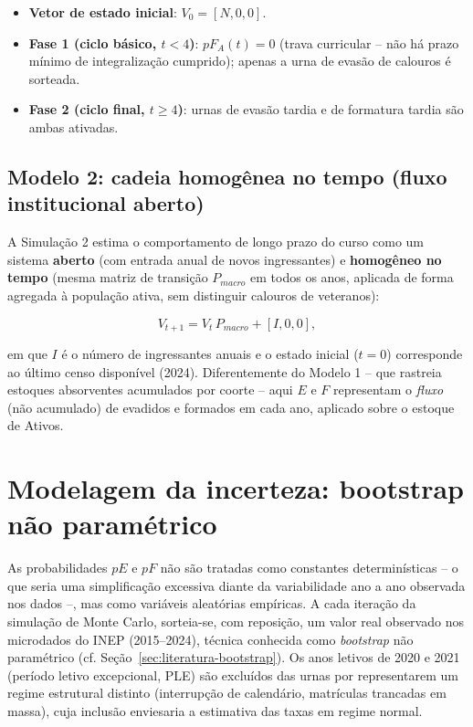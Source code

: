 \documentclass[12pt,times,article,chapter=TITLE]{abnt}
\begin{document}
\begin{itemize}
  \item \textbf{Vetor de estado inicial}: $V_0 = [N, 0, 0]$.
  \item \textbf{Fase 1 (ciclo básico, $t<4$)}: $pF_A(t) = 0$ (trava curricular -- não há prazo mínimo de integralização cumprido); apenas a urna de evasão de calouros é sorteada.
  \item \textbf{Fase 2 (ciclo final, $t \geq 4$)}: urnas de evasão tardia e de formatura tardia são ambas ativadas.
\end{itemize}

\subsection{Modelo 2: cadeia homogênea no tempo (fluxo institucional aberto)}

A Simulação 2 estima o comportamento de longo prazo do curso como um sistema \textbf{aberto} (com entrada anual de novos ingressantes) e \textbf{homogêneo no tempo} (mesma matriz de transição $P_{macro}$ em todos os anos, aplicada de forma agregada à população ativa, sem distinguir calouros de veteranos):

\begin{equation}
V_{t+1} = V_t \, P_{macro} + [I, 0, 0],
\end{equation}

em que $I$ é o número de ingressantes anuais e o estado inicial ($t=0$) corresponde ao último censo disponível (2024). Diferentemente do Modelo 1 -- que rastreia estoques absorventes acumulados por coorte -- aqui $E$ e $F$ representam o \textit{fluxo} (não acumulado) de evadidos e formados em cada ano, aplicado sobre o estoque de Ativos.

\section{Modelagem da incerteza: bootstrap não paramétrico}
\label{sec:formalizacao-bootstrap}

As probabilidades $pE$ e $pF$ não são tratadas como constantes determinísticas -- o que seria uma simplificação excessiva diante da variabilidade ano a ano observada nos dados --, mas como variáveis aleatórias empíricas. A cada iteração da simulação de Monte Carlo, sorteia-se, com reposição, um valor real observado nos microdados do INEP (2015--2024), técnica conhecida como \textit{bootstrap} não paramétrico (cf. Seção~\ref{sec:literatura-bootstrap}). Os anos letivos de 2020 e 2021 (período letivo excepcional, PLE) são excluídos das urnas por representarem um regime estrutural distinto (interrupção de calendário, matrículas trancadas em massa), cuja inclusão enviesaria a estimativa das taxas em regime normal.
\end{document}
